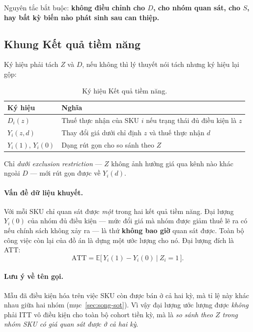 \documentclass[11pt]{article}
\begin{document}
Nguyên tắc bắt buộc: \textbf{không điều chỉnh cho $D$, cho nhóm quan sát, cho $S$, hay bất kỳ biến
nào phát sinh sau can thiệp.}

\subsection{Khung Kết quả tiềm năng}

Ký hiệu phải tách $Z$ và $D$, nếu không thì lý thuyết nói tách nhưng ký hiệu lại gộp:

\begin{table}[htbp]
  \centering
  \caption{Ký hiệu Kết quả tiềm năng.}
  \label{tab:ky-hieu}
  \begin{tabular}{ll}
    \toprule
    Ký hiệu & Nghĩa \\
    \midrule
    $D_i(z)$        & Thuế thực nhận của SKU $i$ nếu trạng thái đủ điều kiện là $z$ \\
    $Y_i(z,d)$      & Thay đổi giá dưới chỉ định $z$ và thuế thực nhận $d$ \\
    $Y_i(1),\,Y_i(0)$ & Dạng rút gọn cho so sánh theo $Z$ \\
    \bottomrule
  \end{tabular}
\end{table}

Chỉ \emph{dưới exclusion restriction} --- $Z$ không ảnh hưởng giá qua kênh nào khác ngoài $D$ ---
mới rút gọn được về $Y_i(d)$.

\paragraph{Vấn đề dữ liệu khuyết.} Với mỗi SKU chỉ quan sát được \emph{một} trong hai kết quả tiềm
năng. Đại lượng $Y_i(0)$ của nhóm đủ điều kiện --- mức đổi giá mà nhóm được giảm thuế lẽ ra có nếu
chính sách không xảy ra --- là thứ \textbf{không bao giờ} quan sát được. Toàn bộ công việc còn lại
của đồ án là dựng một ước lượng cho nó. Đại lượng đích là ATT:
\begin{equation}
  \mathrm{ATT} = \mathbb{E}\big[\,Y_i(1) - Y_i(0)\ \big|\ Z_i = 1\,\big].
  \label{eq:att}
\end{equation}

\paragraph{Lưu ý về tên gọi.} Mẫu đã điều kiện hóa trên việc SKU còn được bán ở cả hai kỳ, mà tỉ
lệ này khác nhau giữa hai nhóm (mục~\ref{sec:song-sot}). Vì vậy đại lượng ước lượng được
\emph{không} phải ITT vô điều kiện cho toàn bộ cohort tiền kỳ, mà là \emph{so sánh theo $Z$ trong
nhóm SKU có giá quan sát được ở cả hai kỳ}.
\end{document}
